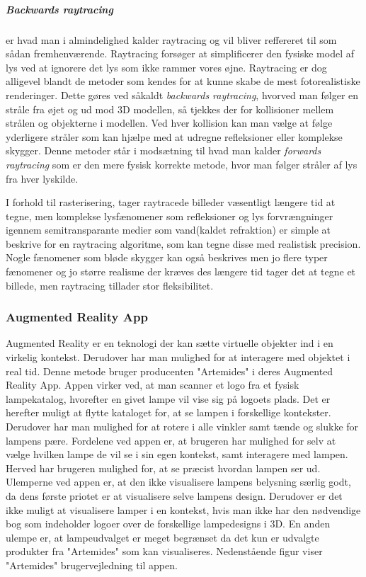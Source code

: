 \subparagraph{Backwards raytracing} er hvad man i almindelighed kalder raytracing og vil bliver reffereret til som sådan fremhenværende. Raytracing forsøger at simplificerer den fysiske model af lys ved at ignorere det lys som ikke rammer vores øjne. Raytracing er dog alligevel blandt de metoder som kendes for at kunne skabe de mest fotorealistiske renderinger. Dette gøres ved såkaldt \textit{backwards raytracing}, hvorved man følger en stråle fra øjet og ud mod 3D modellen, så tjekkes der for kollisioner mellem strålen og objekterne i modellen. Ved hver kollision kan man vælge at følge yderligere stråler som kan hjælpe med at udregne refleksioner eller komplekse skygger. Denne metoder står i modsætning til hvad man kalder \textit{forwards raytracing} som er den mere fysisk korrekte metode, hvor man følger stråler af lys fra hver lyskilde.

I forhold til rasterisering, tager raytracede billeder væsentligt længere tid at tegne, men komplekse lysfænomener som refleksioner og lys forvrængninger igennem semitransparante medier som vand(kaldet refraktion) er simple at beskrive for en raytracing algoritme, som kan tegne disse med realistisk precision. Nogle fænomener som bløde skygger kan også beskrives men jo flere typer fænomener og jo større realisme der kræves des længere tid tager det at tegne et billede, men raytracing tillader stor fleksibilitet.

\subsubsection{Augmented Reality App}

Augmented Reality er en teknologi der kan sætte virtuelle objekter ind i en virkelig kontekst. Derudover har man mulighed for at interagere med objektet i real tid. 
Denne metode bruger producenten "Artemides" i deres Augmented Reality App. Appen virker ved, at man scanner et logo fra et fysisk lampekatalog, hvorefter en givet lampe vil vise sig på logoets plads. Det er herefter muligt at flytte kataloget for, at se lampen i forskellige kontekster. Derudover har man mulighed for at rotere i alle vinkler samt tænde og slukke for lampens pære. 
Fordelene ved appen er, at brugeren har mulighed for selv at vælge hvilken lampe de vil se i sin egen kontekst, samt interagere med lampen. Herved har brugeren mulighed for, at se præcist hvordan lampen ser ud. 
Ulemperne ved appen er, at den ikke visualisere lampens belysning særlig godt, da dens første priotet er at visualisere selve lampens design. Derudover er det ikke muligt at visualisere lamper i en kontekst, hvis man ikke har den nødvendige bog som indeholder logoer over de forskellige lampedesigns i 3D. En anden ulempe er, at lampeudvalget er meget begrænset da det kun er udvalgte produkter fra "Artemides" som kan visualiseres. 
Nedenstående figur viser "Artemides" brugervejledning til appen.

